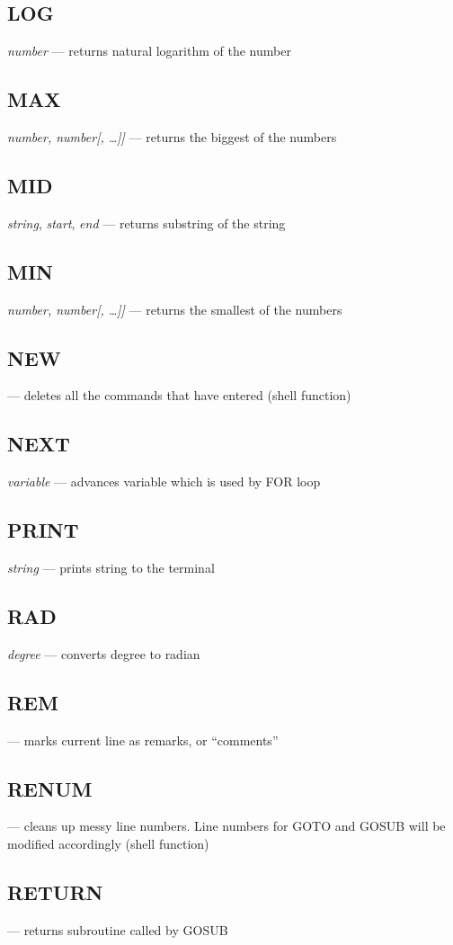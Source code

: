 \subsection{LOG} \emph{number} --- returns natural logarithm of the number
\subsection{MAX} \emph{number, number[, \ldots]]} --- returns the biggest of the numbers
\subsection{MID} \emph{string}, \emph{start}, \emph{end} --- returns substring of the string
\subsection{MIN} \emph{number, number[, \ldots]]} --- returns the smallest of the numbers
\subsection{NEW} --- deletes all the commands that have entered (shell function)
\subsection{NEXT} \emph{variable} --- advances variable which is used by FOR loop
\subsection{PRINT} \emph{string} --- prints string to the terminal
\subsection{RAD} \emph{degree} --- converts degree to radian
\subsection{REM} --- marks current line as remarks, or ``comments''
\subsection{RENUM} --- cleans up messy line numbers. Line numbers for GOTO and GOSUB will be modified accordingly (shell function)
\subsection{RETURN} --- returns subroutine called by GOSUB
